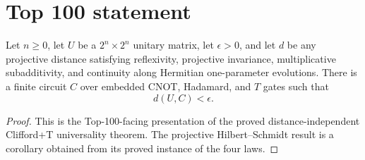 \section{Top 100 statement}

\begin{theorem}
  \label{thm:top100_clifford_t}
  \leanok
  Let $n\geq 0$, let $U$ be a $2^n\times 2^n$ unitary matrix, let
  $\epsilon>0$, and let $d$ be any projective distance satisfying
  reflexivity, projective invariance, multiplicative subadditivity, and
  continuity along Hermitian one-parameter evolutions.  There is a finite
  circuit $C$ over embedded CNOT, Hadamard, and $T$ gates such that
  \[
    d(U,C)<\epsilon.
  \]
\end{theorem}

\begin{proof}
  \leanok
  This is the Top-100-facing presentation of the proved distance-independent
  Clifford+T universality theorem.  The projective Hilbert--Schmidt result is
  a corollary obtained from its proved instance of the four laws.
\end{proof}
